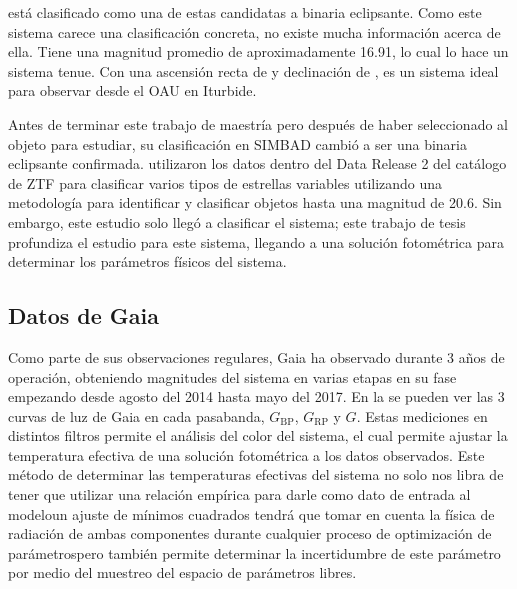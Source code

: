 \textbf{\atoObjId} está clasificado como una de estas candidatas a binaria
eclipsante. Como este sistema carece una clasificación concreta, no existe mucha
información acerca de ella. Tiene una magnitud promedio de aproximadamente
\num{16.91}, lo cual lo hace un sistema tenue. Con una ascensión recta de
 y declinación de , \atoObjId
es un sistema ideal para observar desde el OAU en Iturbide.

Antes de terminar este trabajo de maestría pero después de haber seleccionado al
objeto \atoObjId para estudiar, su clasificación en SIMBAD cambió a ser una
binaria eclipsante confirmada.
 utilizaron los
datos dentro del Data Release 2 del catálogo de ZTF para clasificar varios tipos
de estrellas variables utilizando una metodología para identificar y clasificar
objetos hasta una magnitud de 20.6. Sin embargo, este estudio solo llegó a
clasificar el sistema; este trabajo de tesis profundiza el estudio para este
sistema, llegando a una solución fotométrica para determinar los parámetros
físicos del sistema.

\subsection{Datos de Gaia}

Como parte de sus observaciones regulares, Gaia ha observado \atoObjId durante 3
años de operación, obteniendo magnitudes del sistema en varias etapas en su fase
empezando desde agosto del 2014 hasta mayo del 2017. En la
 se pueden ver las 3 curvas de luz de Gaia en
cada pasabanda, $G_{\mathrm{BP}}$, $G_{\mathrm{RP}}$ y $G$. Estas mediciones en distintos filtros
permite el análisis del color del sistema, el cual permite ajustar la
temperatura efectiva de una solución fotométrica a los datos observados. Este
método de determinar las temperaturas efectivas del sistema no solo nos libra de
tener que utilizar una relación empírica para darle como dato de entrada al
modelo\textemdash un ajuste de mínimos cuadrados tendrá que tomar en cuenta la
física de radiación de ambas componentes durante cualquier proceso de
optimización de parámetros\textemdash pero también permite determinar la
incertidumbre de este parámetro por medio del muestreo del espacio de parámetros
libres.

